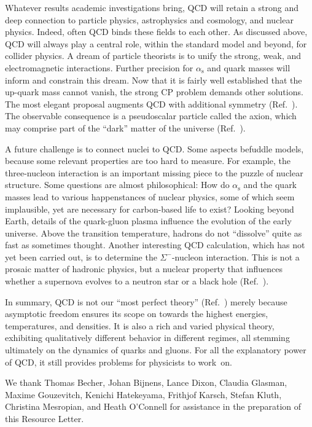 \documentclass[11pt,prb,groupedaddress,nofootinbib,showpacs,floatfix]{revtex4-1}
\newcommand{\alphas}{\ensuremath{\alpha_{\mathrm{s}}}}
\begin{document}
Whatever results academic investigations bring, QCD will retain a 
strong and deep connection to particle physics, astrophysics and 
cosmology, and nuclear physics.
Indeed, often QCD binds these fields to each other.
As discussed above, QCD will always play a central role, within the 
standard model and beyond, for collider physics.
A dream of particle theorists is to unify the strong, weak, and 
electromagnetic interactions.
Further precision for $\alphas$ and quark masses will inform and 
constrain this dream.
Now that it is fairly well established that the up-quark mass cannot 
vanish, the strong CP problem demands other solutions.
The most elegant proposal augments QCD with additional 
symmetry (Ref.~).
The observable consequence is a pseudoscalar particle called the axion, 
which may comprise part of the ``dark'' matter of the 
universe (Ref.~).

A future challenge is to connect nuclei to QCD.
Some aspects befuddle models, because some relevant properties are too 
hard to measure.
For example, the three-nucleon interaction is an important missing 
piece to the puzzle of nuclear structure.
Some questions are almost philosophical:
How do $\alphas$ and the quark masses lead to various 
happenstances of nuclear physics, some of which seem implausible, yet 
are necessary for carbon-based life to exist?
Looking beyond Earth, details of the quark-gluon plasma influence the 
evolution of the early universe.
Above the transition temperature, hadrons do not ``dissolve'' quite as 
fast as sometimes thought.
Another interesting QCD calculation, which has not yet been carried out, 
is to determine the $\Sigma^-$-nucleon interaction.
This is not a prosaic matter of hadronic physics, but a nuclear 
property that influences whether a supernova evolves to a neutron star 
or a black hole (Ref.~).

In summary, QCD is not our ``most perfect theory'' 
(Ref.~) merely because asymptotic freedom 
ensures its scope on towards the highest energies, temperatures, and 
densities.
It is also a rich and varied physical theory, exhibiting qualitatively 
different behavior in different regimes, all stemming ultimately on the 
dynamics of quarks and gluons.
For all the explanatory power of QCD, it still provides problems for 
physicists to work~on.

\acknowledgments

We thank 
Thomas Becher,
Johan Bijnens,
Lance Dixon,
Claudia Glasman,
Maxime Gouzevitch,
Kenichi Hatekeyama,
Frithjof Karsch,
Stefan Kluth,
Christina Mesropian,
and
Heath O'Connell
for assistance in the preparation of this Resource Letter.
\end{document}
